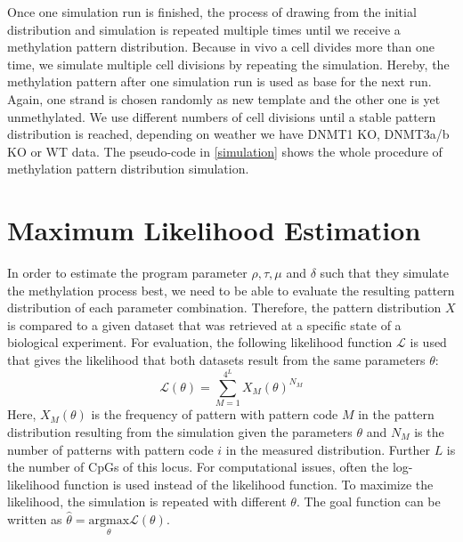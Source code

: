 Once one simulation run is finished, the process of drawing from the initial distribution and simulation is repeated multiple times until we receive a methylation pattern distribution.\newline
Because in vivo a cell divides more than one time, we simulate multiple cell divisions by repeating the simulation. Hereby, the methylation pattern after one simulation run is used as base for the next run. Again, one strand is chosen randomly as new template and the other one is yet unmethylated. We use different numbers of cell divisions until a stable pattern distribution is reached, depending on weather we have DNMT1 \acf{KO}, DNMT3a/b \ac{KO} or \acf{WT} data. The pseudo-code in \ref{simulation} shows the whole procedure of methylation pattern distribution simulation.

\section{Maximum Likelihood Estimation}
\label{MLE}
In order to estimate the program parameter $\rho, \tau, \mu$ and $\delta$ such that they simulate the methylation process best, we need to be able to evaluate the resulting pattern distribution of each parameter combination. Therefore, the pattern distribution $X$ is compared to a given dataset that was retrieved at a specific state of a biological experiment. For evaluation, the following likelihood function $\mathcal{L}$ is used that gives the likelihood that both datasets result from the same parameters $\theta$:
\[\mathcal{L}(\theta) = \sum_{M=1}^{4^L}{X_M(\theta)^{N_M}}\]
Here, $X_M(\theta)$ is the frequency of pattern with pattern code $M$ in the pattern distribution resulting from the simulation given the parameters $\theta$ and $N_M$ is the number of patterns with pattern code $i$ in the measured distribution. Further $L$ is the number of \acp{CpG} of this locus. For computational issues, often the log-likelihood function is used instead of the likelihood function. To maximize the likelihood, the simulation is repeated with different $\theta$. The goal function can be written as\newline
$\hat{\theta} = \underset{\theta}{\mathrm{argmax}} \mathcal{L}(\theta)$.

